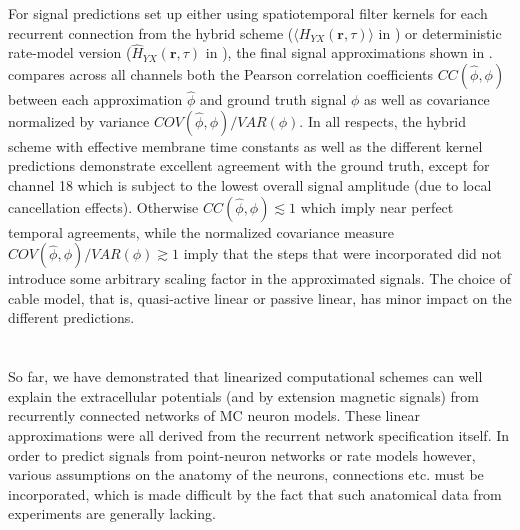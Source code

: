 For signal predictions set up either using spatiotemporal filter kernels for each recurrent connection from the hybrid scheme ($\langle H_{YX}(\mathbf{r}, \tau) \rangle$ in ) or deterministic rate-model version  ($\hat{H}_{YX}(\mathbf{r}, \tau)$ in ), 
the final signal approximations shown in 
. 
 compares across all channels both the Pearson correlation coefficients $CC(\hat{\phi}, \phi)$ between each approximation $\hat{\phi}$ and ground truth signal $\phi$ as well as covariance normalized by variance $COV(\hat{\phi}, \phi)/VAR(\phi)$. 
In all respects, the hybrid scheme with effective membrane time constants as well as the different kernel predictions demonstrate excellent agreement with the ground truth, except for channel 18 which is subject to the lowest overall signal amplitude (due to local cancellation effects). 
Otherwise $CC(\hat{\phi}, \phi) \lesssim 1$ which imply near perfect temporal agreements, 
while the normalized covariance measure $COV(\hat{\phi}, \phi)/VAR(\phi) \gtrsim 1$ imply that the steps that were incorporated did not introduce some arbitrary scaling factor in the approximated signals. 
The choice of cable model, that is, quasi-active linear or passive linear, has minor impact on the different predictions. 


\section{}
\label{sec:Schemes:proxies}

So far, we have demonstrated that linearized computational schemes can well explain the extracellular potentials (and by extension magnetic signals) from recurrently connected networks of MC neuron models. 
These linear approximations were all derived from the recurrent network specification itself. 
In order to predict signals from point-neuron networks or rate models however, 
various assumptions on the anatomy of the neurons, connections etc. must be incorporated, 
which is made difficult by the fact that such anatomical data from experiments are generally lacking. 

